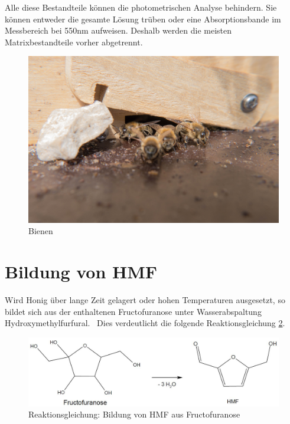 Alle diese Bestandteile können die photometrischen Analyse behindern. Sie können entweder die gesamte Lösung trüben oder eine Absorptionsbande im Messbereich bei 550nm aufweisen. Deshalb werden die meisten Matrixbestandteile vorher abgetrennt.~\cite{LWG}
\begin{figure}[htbp]
	\centering
		\includegraphics[width=1.00\textwidth]{../Bilder/P1050729.jpg}
	\caption{Bienen \cite{Bienen}}
	\label{fig:Bienen}
\end{figure}


\section{Bildung von HMF}

Wird Honig über lange Zeit gelagert oder hohen Temperaturen ausgesetzt, so bildet sich aus der enthaltenen Fructofuranose unter Wasserabspaltung Hydroxymethylfurfural.~\cite{HMF} Dies verdeutlicht die folgende Reaktionsgleichung \ref{fig:HMFEntstehung}. 
  
\begin{figure}[htbp]
	\centering
		\includegraphics[width=1.00\textwidth]{../Bilder/HMFEntstehung.JPG}
	\caption{Reaktionsgleichung: Bildung von HMF aus Fructofuranose}
	\label{fig:HMFEntstehung}
\end{figure}

